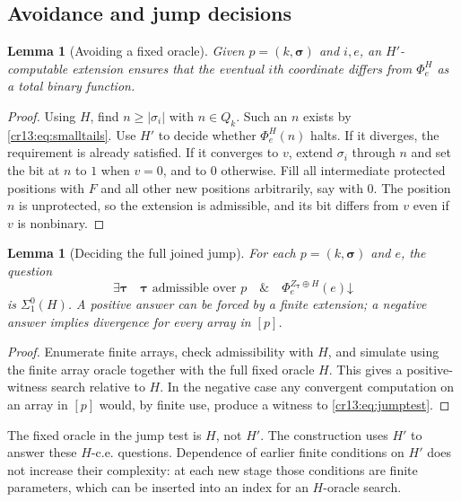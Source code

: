\documentclass[11pt,letterpaper]{article}
\newtheorem{lemma}[theorem]{Lemma}
\theoremstyle{definition}
\theoremstyle{remark}\newtheorem{remark}[theorem]{Remark}
\numberwithin{equation}{section}
\newcommand{\hal}{\mathord\downarrow}
\begin{document}
\subsection{Avoidance and jump decisions}
\begin{lemma}[Avoiding a fixed oracle]\label{cr13:lem:avoid}
Given $p=(k,\boldsymbol\sigma)$ and $i,e$, an $H'$-computable extension ensures that the eventual $i$th coordinate differs from $\Phi_e^H$ as a total binary function.
\end{lemma}
\begin{proof}
Using $H$, find $n\ge|\sigma_i|$ with $n\in Q_k$. Such an $n$ exists by \eqref{cr13:eq:smalltails}. Use $H'$ to decide whether $\Phi_e^H(n)$ halts. If it diverges, the requirement is already satisfied. If it converges to $v$, extend $\sigma_i$ through $n$ and set the bit at $n$ to $1$ when $v=0$, and to $0$ otherwise. Fill all intermediate protected positions with $F$ and all other new positions arbitrarily, say with $0$. The position $n$ is unprotected, so the extension is admissible, and its bit differs from $v$ even if $v$ is nonbinary.
\end{proof}

\begin{lemma}[Deciding the full joined jump]\label{cr13:lem:jump}
For each $p=(k,\boldsymbol\sigma)$ and $e$, the question
\begin{equation}\label{cr13:eq:jumptest}
 \exists\boldsymbol\tau\quad
 \boldsymbol\tau\text{ admissible over }p\quad\&\quad
                     \Phi_e^{Z_{\boldsymbol\tau}\oplus H}(e)\hal
\end{equation}
is $\Sigma^0_1(H)$. A positive answer can be forced by a finite extension; a negative answer implies divergence for every array in $[p]$.
\end{lemma}
\begin{proof}
Enumerate finite arrays, check admissibility with $H$, and simulate using the finite array oracle together with the full fixed oracle $H$. This gives a positive-witness search relative to $H$. In the negative case any convergent computation on an array in $[p]$ would, by finite use, produce a witness to \eqref{cr13:eq:jumptest}.
\end{proof}
The fixed oracle in the jump test is $H$, not $H'$. The construction uses $H'$ to answer these $H$-c.e. questions. Dependence of earlier finite conditions on $H'$ does not increase their complexity: at each new stage those conditions are finite parameters, which can be inserted into an index for an $H$-oracle search.
\end{document}
